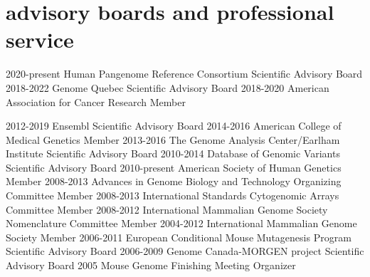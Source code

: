 \documentclass[]{dmc-cv} %
\begin{document}
\section{advisory boards and professional service}

\begin{entrylist}
\smallentry
{2020-present}
{Human Pangenome Reference Consortium}
{Scientific Advisory Board}
\smallentry
{2018-2022}
{Genome Quebec}
{Scientific Advisory Board}
\smallentry
{2018-2020}
{American Association for Cancer Research}
{Member}

\smallentry
{2012-2019}
{Ensembl}
{Scientific Advisory Board}
\smallentry
{2014-2016}
{American College of Medical Genetics}
{Member}
\smallentry
{2013-2016}
{The Genome Analysis Center/Earlham Institute}
{Scientific Advisory Board}
\smallentry
{2010-2014}
{Database of Genomic Variants}
{Scientific Advisory Board}
\smallentry
{2010-present}
{American Society of Human Genetics}
{Member}
\smallentry
{2008-2013}
{Advances in Genome Biology and Technology}
{Organizing Committee Member}
\smallentry
{2008-2013}
{International Standards Cytogenomic Arrays}
{Committee Member}
\smallentry
{2008-2012}
{International Mammalian Genome Society}
{Nomenclature Committee Member}
\smallentry
{2004-2012}
{International Mammalian Genome Society}
{Member}
\smallentry
{2006-2011}
{European Conditional Mouse Mutagenesis Program}
{Scientific Advisory Board}
\smallentry
{2006-2009}
{Genome Canada-MORGEN project}
{Scientific Advisory Board}
\smallentry
{2005}
{Mouse Genome Finishing Meeting}
{Organizer}
\end{entrylist}
\end{document}

